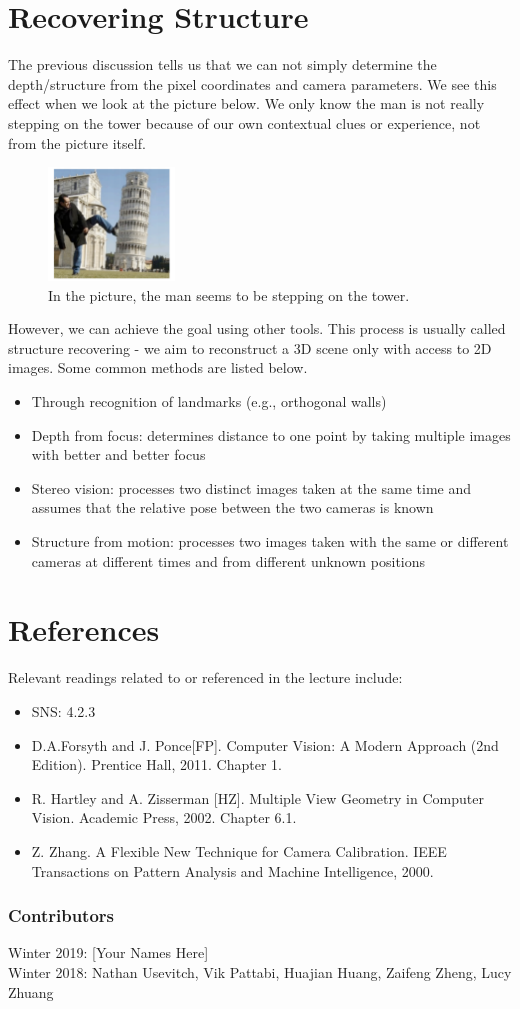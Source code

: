 \documentclass[]{article}
\begin{document}
\section{Recovering Structure}
The previous discussion tells us that we can not simply determine the depth/structure from the pixel coordinates and camera parameters. We see this effect when we look at the picture below. We only know the man is not really stepping on the tower because of our own contextual clues or experience, not from the picture itself.

\begin{figure}[H]
\includegraphics[width=0.3\textwidth]{stepping_on_tower.png}
\centering
\caption{In the picture, the man seems to be stepping on the tower.}
\label{fig:stepping_on_tower}
\end{figure}

However, we can achieve the goal using other tools. This process is usually called structure recovering - we aim to reconstruct a 3D scene only with access to 2D images. Some common methods are listed below.

\begin{itemize}
  \item Through	recognition of landmarks (e.g., orthogonal walls)
  \item Depth from focus: determines distance to one point by taking multiple images with better and better focus
  \item Stereo vision: processes two distinct images taken at the same time and assumes that the relative pose between the two cameras is known
  \item Structure from motion: processes two images taken with the same or different cameras at different times and from different unknown positions
\end{itemize}

\section{References}
Relevant readings related to or referenced in the lecture include:
\begin{itemize}
  \item SNS: 4.2.3
  \item D.A.Forsyth	and	J.	Ponce[FP]. Computer Vision:	A	Modern	Approach	(2nd
Edition).	Prentice	Hall,	2011.	Chapter	1.
  \item R.	Hartley	and	A.	Zisserman	[HZ].	Multiple	View	Geometry	in	Computer
Vision.	Academic	Press,	2002.	Chapter	6.1.
  \item Z.	Zhang.	A	Flexible	New	Technique	for	Camera	Calibration. IEEE	Transactions
on	Pattern	Analysis	and	Machine	Intelligence,	2000.
\end{itemize}

\subsubsection*{Contributors}
Winter 2019: [Your Names Here]
\\
Winter 2018: Nathan Usevitch, Vik Pattabi, Huajian Huang, Zaifeng Zheng, Lucy Zhuang
\end{document}
